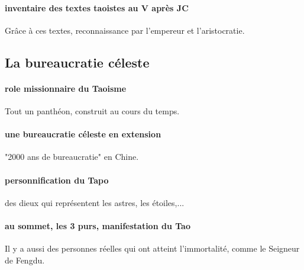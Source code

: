 \paragraph{inventaire des textes taoistes au V après JC} Grâce à ces textes, reconnaissance par l'empereur et l'aristocratie. 



\subsection{La bureaucratie céleste}


\paragraph{role missionnaire du Taoisme} Tout un panthéon, construit au cours du temps. 

\paragraph{une bureaucratie céleste en extension} "2000 ans de bureaucratie" en Chine. 

\paragraph{personnification du Tapo} des dieux qui représentent les astres, les étoiles,...

\paragraph{au sommet, les 3 purs, manifestation du Tao} Il y a aussi des personnes réelles qui ont atteint l'immortalité, comme le Seigneur de Fengdu. 



